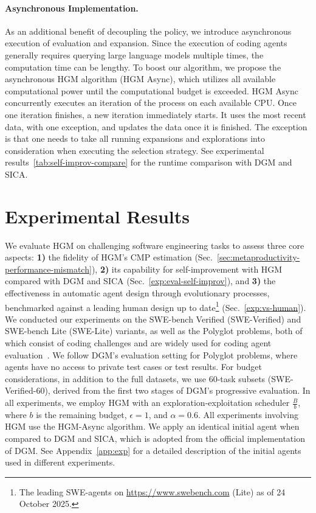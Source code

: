 \documentclass{article} %
\begin{document}
\paragraph{Asynchronous Implementation.}\label{method:async-parallel}
As an additional benefit of decoupling the policy, we introduce asynchronous execution of evaluation and expansion. Since the execution of coding agents generally requires querying large language models multiple times, the computation time can be lengthy. To boost our algorithm, we propose the asynchronous HGM algorithm (HGM Async), which utilizes all available computational power until the computational budget is exceeded. HGM Async concurrently executes an iteration of the process on each available CPU. Once one iteration finishes, a new iteration immediately starts. It uses the most recent data, with one exception, and updates the data once it is finished. The exception is that one needs to take all running expansions and explorations into consideration when executing the selection strategy. 
See experimental results~\ref{tab:self-improv-compare} for the runtime comparison with DGM and SICA. 






\section{Experimental Results}
\label{sec:exp}
We evaluate HGM on challenging software engineering tasks to assess three core aspects: \textbf{1)} the fidelity of HGM’s $\mathrm{CMP}$ estimation (Sec.~\ref{sec:metaproductivity-performance-mismatch}), \textbf{2)} its capability for self-improvement with HGM compared with DGM and SICA (Sec.~\ref{exp:eval-self-improv}), and \textbf{3)} the effectiveness in automatic agent design through evolutionary processes, benchmarked against a leading human design up to date\footnote{The leading SWE-agents on \url{https://www.swebench.com} (Lite) as of 24 October 2025.} (Sec.~\ref{exp:vs-human}). We conducted our experiments on the SWE-bench Verified (SWE-Verified) and SWE-bench Lite (SWE-Lite) variants, as well as the Polyglot problems, both of which consist of coding challenges and are widely used for coding agent evaluation~\citep{xia2025demystifying,zhang2024autocoderover,zhang2025swe}. We follow DGM's evaluation setting for Polyglot problems, where agents have no access to private test cases or test results.  For budget considerations, in addition to the full datasets, we use 60-task subsets (SWE-Verified-60), derived from the first two stages of DGM’s progressive evaluation. In all experiments, we employ HGM with an exploration-exploitation scheduler $\frac{B}{b}$, where $b$ is the remaining budget, $\epsilon = 1$, and $\alpha = 0.6$. All experiments involving HGM use the HGM‑Async algorithm.
We apply an identical initial agent when compared to DGM and SICA, which is adopted from the official implementation of DGM. See Appendix~\ref{app:exp} for a detailed description of the initial agents used in different experiments.
\end{document}
